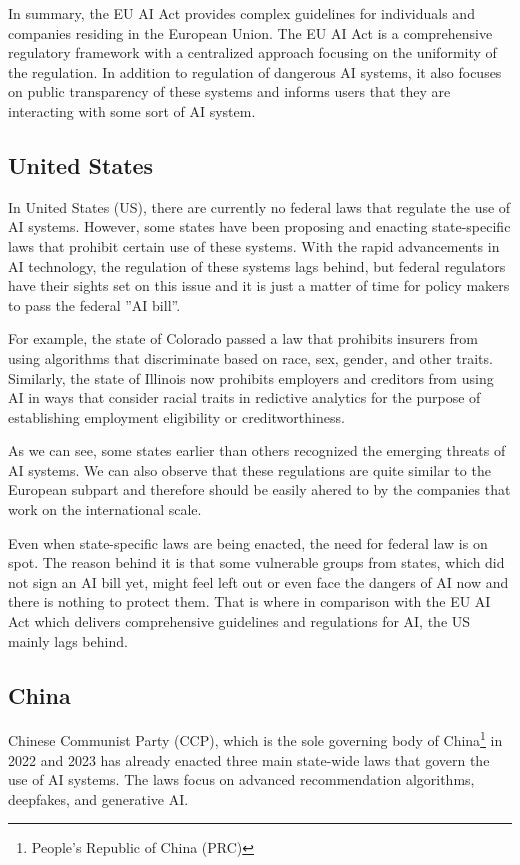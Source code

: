 In summary, the EU AI Act provides complex guidelines for individuals and companies residing in the European Union. The EU AI Act is a comprehensive regulatory framework with a centralized approach focusing on the uniformity of the regulation. In addition to regulation of dangerous AI systems, it also focuses on public transparency of these systems and informs users that they are interacting with some sort of AI system.


\subsection{United States}
In United States (US), there are currently no federal laws that regulate the use of AI systems. However, some states have been proposing and enacting state-specific laws that prohibit certain use of these systems. With the rapid advancements in AI technology, the regulation of these systems lags behind, but federal regulators have their sights set on this issue and it is just a matter of time for policy makers to pass the federal ''AI bill''.

For example, the state of Colorado passed a law that prohibits insurers from using algorithms that discriminate based on race, sex, gender, and other traits. Similarly, the state of Illinois now prohibits employers and creditors from using AI in ways that consider racial traits in redictive analytics for the purpose of establishing employment eligibility or creditworthiness\cite{Parinandi_Crosson_Peterson_Nadarevic_2024}.

As we can see, some states earlier than others recognized the emerging threats of AI systems. We can also observe that these regulations are quite similar to the European subpart and therefore should be easily ahered to by the companies that work on the international scale.

Even when state-specific laws are being enacted, the need for federal law is on spot. The reason behind it is that some vulnerable groups from states, which did not sign an AI bill yet, might feel left out or even face the dangers of AI now and there is nothing to protect them. That is where in comparison with the EU AI Act which delivers comprehensive guidelines and regulations for AI, the US mainly lags behind.

\subsection{China}
Chinese Communist Party (CCP), which is the sole governing body of China\footnote{People's Republic of China (PRC)} in 2022 and 2023 has already enacted three main state-wide laws that govern the use of AI systems. The laws focus on advanced recommendation algorithms, deepfakes, and generative AI.

